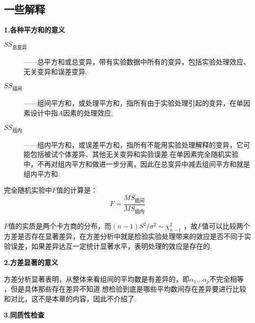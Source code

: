 \subsection{一些解释}

\textbf{1.各种平方和的意义}

\begin{description}
\item[$SS_{\text{总变异}}$] ——总平方和或总变异，带有实验数据中所有的变异，包括实验处理效应、无关变异和误差变异.
\item[$SS_{\text{组间}}$]——组间平方和，或处理平方和，指所有由于实验处理引起的变异，在单因素设计中指$A$因素的处理效应.
\item[$SS_{\text{组内}}$]——组内平方和，或误差平方和，指所有不能用实验处理解释的变异，它可能包括被试个体差异、其他无关变异和实验误差.在单因素完全随机实验中，不再对组内平方和做进一步分离，因此在总变异中减去组间平方和就是组内平方和.
\end{description}

完全随机实验中$F$值的计算是：
\[
F=\frac{MS_{\text{组间}}}{MS_{\text{组内}}}
\]

$F$值的实质是两个卡方商的分布，而$(n-1)S^2/\sigma ^2 \sim \chi ^2_{n-1}$
，故$F$值可以比较两个方差是否存在显著差异，在方差分析中就是检验实验处理带来的效应是否不同于实验误差，如果差异达互一定统计显著水平，表明处理的效应是存在的.

\textbf{2.方差显著的意义}

方差分析显著表明，从整体来看组间的平均数是有差异的，即$\alpha _1 \dots \alpha _p$不完全相等
，但是具体那些存在差异不知道.想检验到底是哪些平均数间存在差异要进行比较和对比，这不是本章的内容，因此不介绍了.

\textbf{3.同质性检查}


